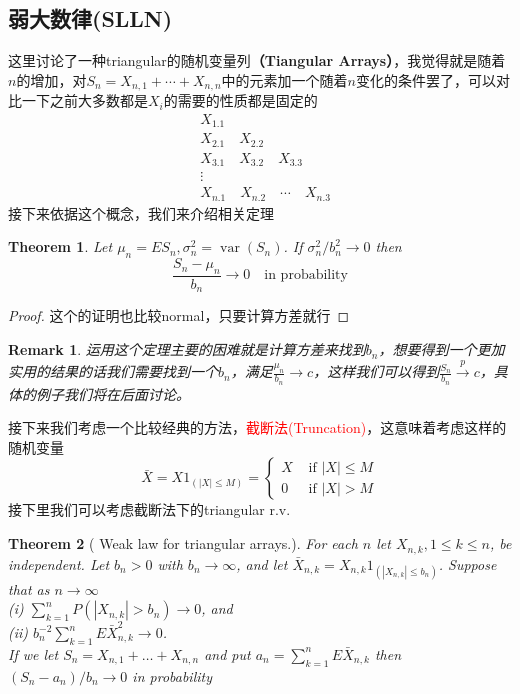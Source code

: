 \documentclass{article}
\newtheorem{theorem}{Theorem}[section]
\newtheorem*{proof}{Proof}
\newtheorem{remark}{Remark}[theorem]
\begin{document}
\subsection{弱大数律(SLLN)}
这里讨论了一种triangular的随机变量列\textbf{（Tiangular Arrays）}，我觉得就是随着$n$的增加，对$S_n=X_{n, 1}+\cdots+X_{n, n}$中的元素加一个随着$n$变化的条件罢了，可以对比一下之前大多数都是$X_i$的需要的性质都是固定的
\[ \begin{aligned} 
				& X_{1.1} \\ 
				& X_{2.1}\quad X_{2.2} \\ 
				& X_{3.1}\quad X_{3.2}\quad X_{3.3}\\
				& \vdots \\
				& X_{n.1}\quad X_{n.2}\quad \cdots\quad X_{n.3} 
\end{aligned} \]
接下来依据这个概念，我们来介绍相关定理
\begin{theorem}
	\label{triangular WLLN}
	 Let $\mu_n=E S_n, \sigma_n^2=\operatorname{var}\left(S_n\right)$. If $\sigma_n^2 / b_n^2 \rightarrow 0$ then 
	 \begin{equation*}
	 	\frac{S_n-\mu_n}{b_n} \rightarrow 0 \quad\text{in probability}
	 \end{equation*}
\end{theorem}
\begin{proof}
	这个的证明也比较normal，只要计算方差就行
\end{proof}
\begin{remark}
	\label{remark of triangular WLLN}
	运用这个定理主要的困难就是计算方差来找到$b_n$，想要得到一个更加实用的结果的话我们需要找到一个$b_n$，满足$\frac{\mu_n}{b_n}\to c$，这样我们可以得到$\frac{S_n}{b_n}\stackrel{p}{\rightarrow}c$，具体的例子我们将在后面讨论。
\end{remark}
接下来我们考虑一个比较经典的方法，\textcolor{red}{截断法(Truncation)}，这意味着考虑这样的随机变量
\begin{equation*}
	\bar{X}=X 1_{(|X| \leq M)}= \begin{cases}X & \text { if }|X| \leq M \\ 0 & \text { if }|X|>M\end{cases}
\end{equation*}
接下里我们可以考虑截断法下的triangular r.v.
\begin{theorem}[ Weak law for triangular arrays.]
	\label{trucation WLLN}
 For each $n$ let $X_{n, k}, 1 \leq k \leq n$, be independent. Let $b_n>0$ with $b_n \rightarrow \infty$, and let $\bar{X}_{n, k}=X_{n, k} 1_{\left(\left|X_{n, k}\right| \leq b_n\right)}$. Suppose that as $n \rightarrow \infty$\\
		(i) $\sum_{k=1}^n P\left(\left|X_{n, k}\right|>b_n\right) \rightarrow 0$, and
		\\(ii) $b_n^{-2} \sum_{k=1}^n E \bar{X}_{n, k}^2 \rightarrow 0$.\\
		If we let $S_n=X_{n, 1}+\ldots+X_{n, n}$ and put $a_n=\sum_{k=1}^n E \bar{X}_{n, k}$ then\\ $\left(S_n-a_n\right) / b_n \rightarrow 0$ in probability
\end{theorem}
\end{document}
